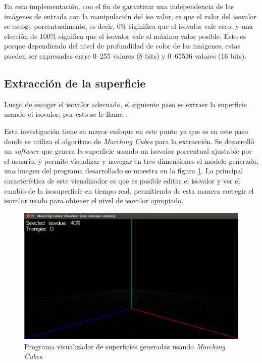 En esta implementación, con el fin de garantizar una independencia de las imágenes de entrada con la manipulación del iso valor, es que el valor del isovalor se escoge porcentualmente, es decir, $0\%$ siginifica que el isovalor vale cero, y una elección de $100\%$ significa que el isovalor vale el máximo valor posible. Esto es porque dependiendo del nivel de profundidad de color de las imágenes, estas pueden ser expresadas entre 0--255 valores (8 bits) y 0--65536 valores (16 bits).

\subsection{Extracción de la superficie}
\label{ch:propuesta:sec:extraccionDeLaSuperficie}

Luego de escoger el isovalor adecuado, el siguiente paso es extraer la superficie usando el isovalor, por esto se le llama .

Esta investigación tiene su mayor enfoque en este punto ya que es en este paso donde se utiliza el algoritmo de \emph{Marching Cubes} para la extracción. Se desarrolló un \emph{software} que genera la superficie usando un isovalor porcentual ajustable por el usuario, y permite visualizar y navegar en tres dimensiones el modelo generado, una imagen del programa desarrollado se muestra en la figura \ref{f:flujoDeTrabajo:visualizer_1}. La principal característica de este visualizador es que es posible editar el isovalor y ver el cambio de la isosuperficie en tiempo real, permitiendo de esta manera corregir el isovalor usado para obtener el nivel de isovalor apropiado.

\begin{figure}[h]
\centering
	\includegraphics[width=1.0\textwidth]{images/visualizer/visualizer_1.png}
\caption{Programa visualizador de superficies generadas usando \emph{Marching Cubes}}
\label{f:flujoDeTrabajo:visualizer_1}
\end{figure}


